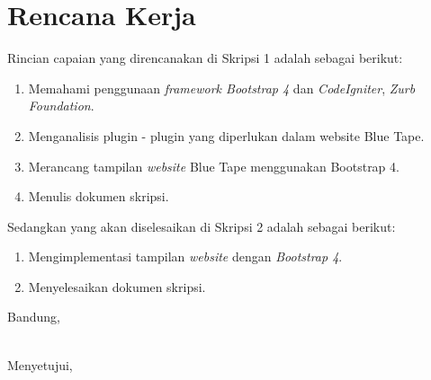 \documentclass[a4paper,twoside]{article}
\begin{document}
\section{Rencana Kerja}
Rincian capaian yang direncanakan di Skripsi 1 adalah sebagai berikut:
\begin{enumerate}
\item Memahami penggunaan \textit{framework Bootstrap 4} dan \textit{CodeIgniter}, \textit{Zurb Foundation}.
\item Menganalisis plugin - plugin yang diperlukan dalam website Blue Tape.
\item Merancang tampilan \textit{website} Blue Tape menggunakan Bootstrap 4.
\item Menulis dokumen skripsi.
\end{enumerate}

Sedangkan yang akan diselesaikan di Skripsi 2 adalah sebagai berikut:
\begin{enumerate}
\item Mengimplementasi tampilan \textit{website} dengan \textit{Bootstrap 4}.
\item Menyelesaikan dokumen skripsi.
\end{enumerate}

\vspace{1cm}
\centering Bandung, \tanggal\\
\vspace{2cm} \nama \\ 
\vspace{1cm}

Menyetujui, \\
\end{document}
